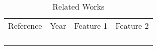 \begin{table}[]
\caption{Related Works}
\label{table-related-works}
\begin{tabular}{@{}llll@{}}
Reference & Year & Feature 1 & Feature 2 \\
          &      &           &           \\
          &      &           &           \\
          &      &           &           \\
          &      &           &          
\end{tabular}
\end{table}